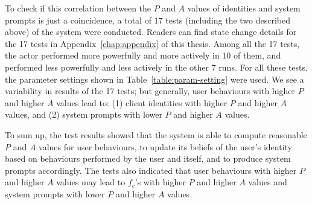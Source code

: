 To check if this correlation between the $P$ and $A$ values of identities and system prompts is just a coincidence, a total of 17 tests (including the two described above) of the system were conducted. Readers can find state change details for the 17 tests in Appendix~\ref{chap:appendix} of this thesis. Among all the 17 tests, the actor performed more powerfully and more actively in 10 of them, and performed less powerfully and less actively in the other 7 runs. For all these tests, the parameter settings shown in Table~\ref{table:param-setting} were used. We see a variability in results of the 17 tests; but generally, user behaviours with higher $P$ and higher $A$ values lead to:
(1) client identities with higher $P$ and higher $A$ values, and
(2) system prompts with lower $P$ and higher $A$ values.

To sum up, the test results showed that the system is able to compute reasonable $P$ and $A$ values for user behaviours, to update its beliefs of the user's identity based on behaviours performed by the user and itself, and to produce system prompts accordingly. The tests also indicated that user behaviours with higher $P$ and higher $A$ values may lead to $f_c$'s with higher $P$ and higher $A$ values and system prompts with lower $P$ and higher $A$ values.
